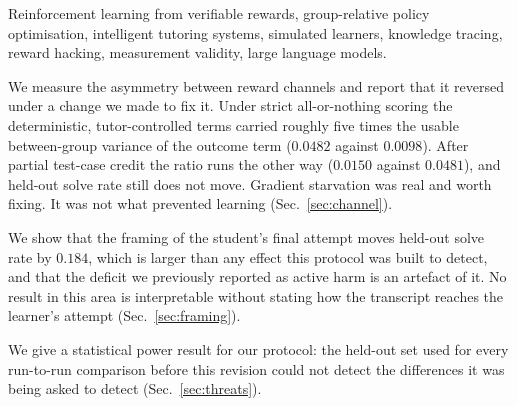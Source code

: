 %
\begin{IEEEkeywords}
Reinforcement learning from verifiable rewards, group-relative policy
optimisation, intelligent tutoring systems, simulated learners, knowledge
tracing, reward hacking, measurement validity, large language models.
\end{IEEEkeywords}


%
\item We measure the asymmetry between reward channels and report that it
      reversed under a change we made to fix it. Under strict all-or-nothing
      scoring the deterministic, tutor-controlled terms carried roughly five
      times the usable between-group variance of the outcome term ($0.0482$
      against $0.0098$). After partial test-case credit the ratio runs the other
      way ($0.0150$ against $0.0481$), and held-out solve rate still does not
      move. Gradient starvation was real and worth fixing. It was not what
      prevented learning (Sec.~\ref{sec:channel}).
\item We show that the framing of the student's final attempt moves held-out
      solve rate by $0.184$, which is larger than any effect this protocol was
      built to detect, and that the deficit we previously reported as active
      harm is an artefact of it. No result in this area is interpretable
      without stating how the transcript reaches the learner's attempt
      (Sec.~\ref{sec:framing}).
\item We give a statistical power result for our protocol: the held-out set used
      for every run-to-run comparison before this revision could not detect the
      differences it was being asked to detect (Sec.~\ref{sec:threats}).


